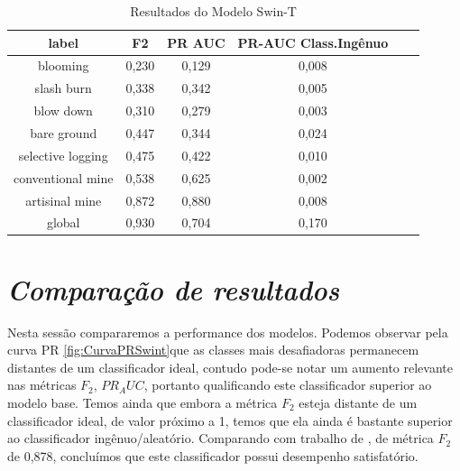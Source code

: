 \begin{table}[h!]
        \caption{Resultados do Modelo Swin-T}
        \centering
    \begin{tabular}{*{6}{c}}
        \toprule
                     label &  F2    &   PR AUC &  PR-AUC Class.Ingênuo \\
        \midrule
                  blooming &  0,230 &    0,129 &       0,008 \\
                slash burn &  0,338 &    0,342 &       0,005 \\
                 blow down &  0,310 &    0,279 &       0,003 \\
               bare ground &  0,447 &    0,344 &       0,024 \\
         selective logging &  0,475 &    0,422 &       0,010 \\
         conventional mine &  0,538 &    0,625 &       0,002 \\
            artisinal mine &  0,872 &    0,880 &       0,008 \\
                    global &  0,930 &    0,704 &       0,170 \\
        \bottomrule
    \end{tabular}
    \label{table:ResultadosSwinT}
\end{table}
    
    
\section{\textit{Comparação de resultados}}\label{sec:Cap4_Comparação de resultados}    

Nesta sessão compararemos a performance dos modelos. Podemos observar pela curva PR \ref{fig:CurvaPRSwint}que as classes mais desafiadoras permanecem distantes de um classificador ideal, contudo pode-se notar um aumento relevante nas métricas $F_2$, $PR_AUC$, portanto qualificando este classificador superior ao modelo base. Temos ainda que embora a métrica $F_2$ esteja distante de um classificador ideal, de valor próximo a 1, temos que ela ainda é bastante superior ao classificador ingênuo/aleatório. Comparando com trabalho de \cite{9701667}, de métrica $F_2$ de 0,878, concluímos que este classificador possui desempenho satisfatório.



